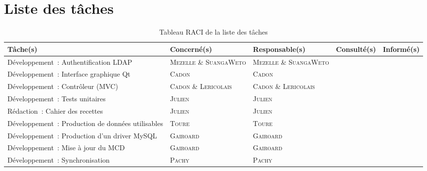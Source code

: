 \documentclass[11pt,fleqn]{report}
\begin{document}
\section{Liste des tâches}
\begin{table}[h]
	\begin{tabularx}{\linewidth}{X X X X X}
	\toprule
	\textbf{Tâche(s)} &	\textbf{Concerné(s)} & \textbf{Responsable(s)} & \textbf{Consulté(s)} & \textbf{Informé(s)} \\
	\midrule
	Développement~: Authentification LDAP & \textsc{Mezelle} \& \textsc{SuangaWeto} & \textsc{Mezelle} \& \textsc{SuangaWeto} & \amo & \amo \\
	\midrule
	Développement~: Interface graphique Qt & \textsc{Cadon} & \textsc{Cadon} & \amo  & \amo \\
	\midrule
	Développement~: Contrôleur (MVC) & \textsc{Cadon} \& \textsc{Lericolais} & \textsc{Cadon} \& \textsc{Lericolais} & \amo  & \amo \\
	\midrule
	Développement~: Tests unitaires & \textsc{Julien} & \textsc{Julien} & \amo & \amo \\
	\midrule
	Rédaction~: Cahier des recettes & \textsc{Julien} & \textsc{Julien} & \amo & \amo \\
	\midrule
	Développement~: Production de données utilisables & \textsc{Toure} & \textsc{Toure} & \amo & \amo \\
	\midrule	
	Développement~: Production d'un driver MySQL & \textsc{Gairoard} & \textsc{Gairoard} & \amo & \amo \\
	\midrule
	Développement~: Mise à jour du MCD & \textsc{Gairoard} & \textsc{Gairoard} & \amo & \amo \\
	\midrule	
	Développement~: Synchronisation & \textsc{Pachy} & \textsc{Pachy} & \amo & \amo \\
	\midrule
	\end{tabularx}
	\caption{Tableau RACI de la liste des tâches}
\end{table}
\end{document}
